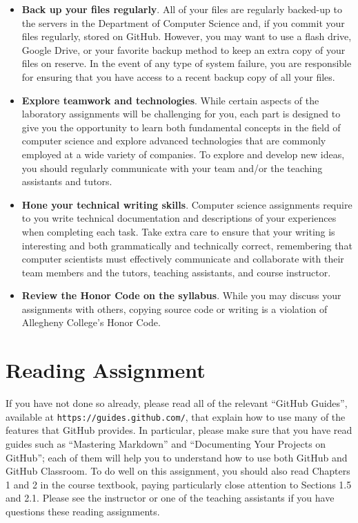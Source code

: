 \documentclass[11pt]{article}
\newcommand{\url}[1]{\lstinline{#1}}
\begin{document}
\begin{itemize}
\item {\bf Back up your files regularly}. All of your files are regularly backed-up to the servers in the Department of
  Computer Science and, if you commit your files regularly, stored on GitHub. However, you may want to use a flash
  drive, Google Drive, or your favorite backup method to keep an extra copy of your files on reserve. In the event of
  any type of system failure, you are responsible for ensuring that you have access to a recent backup copy of all your
  files.

\item {\bf Explore teamwork and technologies}. While certain aspects of the laboratory assignments will be challenging
  for you, each part is designed to give you the opportunity to learn both fundamental concepts in the field of computer
  science and explore advanced technologies that are commonly employed at a wide variety of companies. To explore and
  develop new ideas, you should regularly communicate with your team and/or the teaching assistants and tutors.

\item {\bf Hone your technical writing skills}. Computer science assignments require to you write technical
  documentation and descriptions of your experiences when completing each task. Take extra care to ensure that your
  writing is interesting and both grammatically and technically correct, remembering that computer scientists must
  effectively communicate and collaborate with their team members and the tutors, teaching assistants, and course
  instructor.

\item {\bf Review the Honor Code on the syllabus}. While you may discuss your assignments with others, copying source
  code or writing is a violation of Allegheny College's Honor Code.

\end{itemize}

\section*{Reading Assignment}

If you have not done so already, please read all of the relevant ``GitHub Guides'', available at
\url{https://guides.github.com/}, that explain how to use many of the features that GitHub provides. In particular,
please make sure that you have read guides such as ``Mastering Markdown'' and ``Documenting Your Projects on GitHub'';
each of them will help you to understand how to use both GitHub and GitHub Classroom. To do well on this assignment, you
should also read Chapters 1 and 2 in the course textbook, paying particularly close attention to Sections 1.5 and 2.1.
Please see the instructor or one of the teaching assistants if you have questions these reading assignments.
\end{document}
